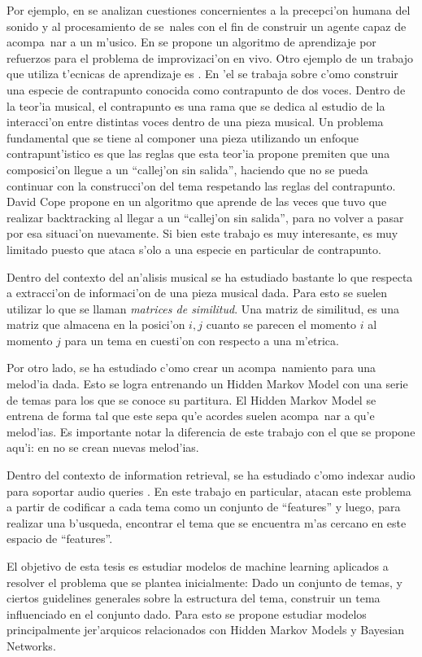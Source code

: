 \documentclass[a4paper,10pt]{article}
\begin{document}
\begin{description}
    Por ejemplo, en \cite{nickcollinsphd} se analizan cuestiones concernientes a la
    precepci'on humana del sonido y al procesamiento de se~nales con el fin de construir 
    un agente capaz de acompa~nar a un m'usico. En \cite{NCP1} se propone un
    algoritmo de aprendizaje por refuerzos para el problema de improvizaci'on en
    vivo. 
	Otro ejemplo de un trabajo que utiliza t'ecnicas de aprendizaje es 
	\cite{DaCo}. En 'el se trabaja sobre c'omo construir una especie de contrapunto conocida como contrapunto 
	de dos voces. Dentro de la teor'ia musical, el contrapunto es una rama que se dedica al estudio de la 
	interacci'on entre distintas voces dentro de una pieza musical. Un problema fundamental que se tiene 
	al componer una pieza utilizando un enfoque contrapunt'istico es que las reglas que esta teor'ia propone 
	premiten que una composici'on llegue a un ``callej'on sin salida'', haciendo que no se pueda continuar 
	con la construcci'on del tema respetando las reglas del contrapunto. David Cope propone en \cite{DaCo} 
	un algoritmo que aprende de las veces que tuvo que realizar backtracking al llegar a un ``callej'on sin 
	salida'', para no volver a pasar por esa situaci'on nuevamente. Si bien este trabajo es muy
	interesante, es muy limitado puesto que ataca s'olo a una especie en particular de contrapunto.
	 
	
	Dentro del contexto del an'alisis musical se ha estudiado bastante lo que respecta a extracci'on de 
	informaci'on de una pieza musical dada\cite{FXPAL}\cite{BeMe}\cite{FooJoCooMa}. 
	Para esto se suelen utilizar lo que se llaman \emph{matrices de similitud}.  Una matriz de similitud, 
	es una matriz que almacena en la posici'on $i, j$ cuanto se parecen el momento $i$ al momento $j$ 
	para un tema en cuesti'on con respecto a una m'etrica. 


	Por otro lado, se ha estudiado c'omo crear un acompa~namiento para una melod'ia dada\cite{MySong}. 
	Esto se logra entrenando un Hidden Markov Model con una serie de temas para los que se conoce su 
	partitura. El Hidden Markov Model se entrena de forma tal que este sepa qu'e acordes suelen acompa~nar 
	a qu'e melod'ias.  Es importante notar la diferencia de este trabajo con el que se propone aqu'i: 
	en \cite{MySong} no se crean nuevas melod'ias.


	Dentro del contexto de information retrieval, se ha estudiado c'omo indexar audio para soportar audio
	queries \cite{IoAlApYa}. En este trabajo en particular, atacan este problema a partir de codificar a cada 
	tema como un conjunto de ``features'' y luego, para realizar una b'usqueda, encontrar el tema que 
	se encuentra m'as cercano en este espacio de ``features''. 


	El objetivo de esta tesis es estudiar modelos de machine learning aplicados a resolver el problema que
	se plantea inicialmente: Dado un conjunto de temas, y ciertos guidelines generales sobre la estructura
	del tema, construir un tema influenciado en el conjunto dado. Para esto se propone estudiar modelos 
	principalmente jer'arquicos relacionados con Hidden Markov Models y Bayesian Networks.

 \end{description}
\end{document}
